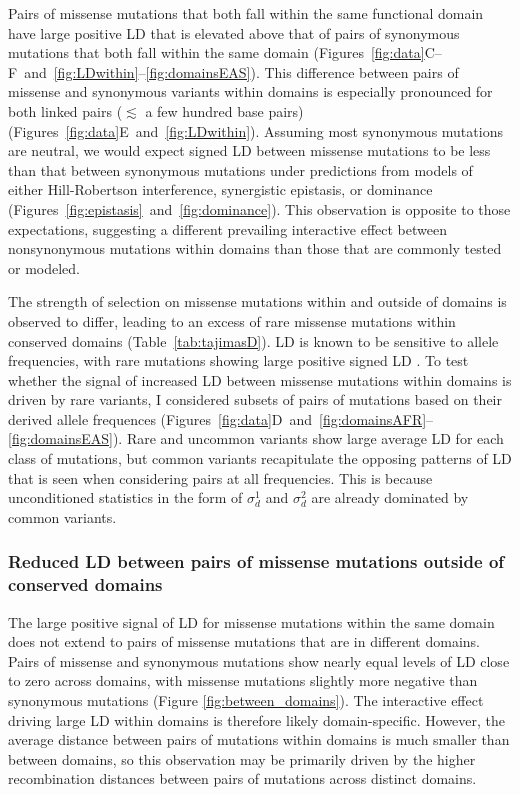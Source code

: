 \documentclass[]{article}
\begin{document}
Pairs of missense mutations that both fall within the same functional domain
have large positive LD that is elevated above that of pairs of synonymous
mutations that both fall within the same domain
(Figures~\ref{fig:data}C--F~and~\ref{fig:LDwithin}--\ref{fig:domainsEAS}). This
difference between pairs of missense and synonymous variants within domains is
especially pronounced for both linked pairs (\(\lesssim\) a few hundred base
pairs) (Figures~\ref{fig:data}E~and~\ref{fig:LDwithin}). Assuming most
synonymous mutations are neutral, we would expect signed LD between missense
mutations to be less than that between synonymous mutations under predictions
from models of either Hill-Robertson interference, synergistic epistasis, or
dominance (Figures~\ref{fig:epistasis}~and~\ref{fig:dominance}). This
observation is opposite to those expectations, suggesting a different
prevailing interactive effect between nonsynonymous mutations within domains
than those that are commonly tested or modeled.

The strength of selection on missense mutations within and outside of domains
is observed to differ, leading to an excess of rare missense mutations within
conserved domains (Table~\ref{tab:tajimasD}). LD is known to be sensitive to
allele frequencies, with rare mutations showing large positive signed LD
\citep{Good2022-ot}. To test whether the signal of increased LD between
missense mutations within domains is driven by rare variants, I considered
subsets of pairs of mutations based on their derived allele frequences
(Figures~\ref{fig:data}D~and~\ref{fig:domainsAFR}--\ref{fig:domainsEAS}). Rare
and uncommon variants show large average LD for each class of mutations, but
common variants recapitulate the opposing patterns of LD that is seen when
considering pairs at all frequencies. This is because unconditioned statistics
in the form of \(\sigma_d^1\) and \(\sigma_d^2\) are already dominated by
common variants.

\subsubsection{Reduced LD between pairs of missense mutations outside of conserved domains}

The large positive signal of LD for missense mutations within the same domain
does not extend to pairs of missense mutations that are in different domains.
Pairs of missense and synonymous mutations show nearly equal levels of LD close
to zero across domains, with missense mutations slightly more negative than
synonymous mutations (Figure \ref{fig:between_domains}). The interactive effect
driving large LD within domains is therefore likely domain-specific. However,
the average distance between pairs of mutations within domains is much smaller
than between domains, so this observation may be primarily driven by the higher
recombination distances between pairs of mutations across distinct domains.
\end{document}
